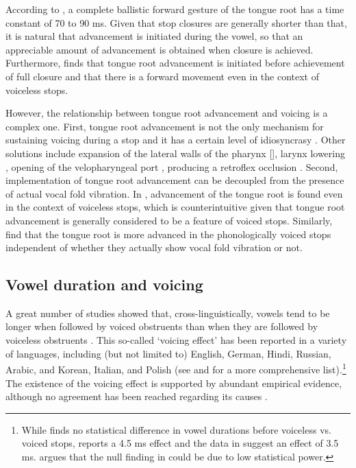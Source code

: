 \documentclass[12pt,]{article}
\let\rmarkdownfootnote\footnote%
\def\footnote{\protect\rmarkdownfootnote}
\begin{document}
According to \citet{rothenberg1967}, a complete ballistic forward
gesture of the tongue root has a time constant of 70 to 90 ms. Given
that stop closures are generally shorter than that, it is natural that
advancement is initiated during the vowel, so that an appreciable amount
of advancement is obtained when closure is achieved. Furthermore,
\citet{westbury1983} finds that tongue root advancement is initiated
before achievement of full closure and that there is a forward movement
even in the context of voiceless stops.

However, the relationship between tongue root advancement and voicing is
a complex one. First, tongue root advancement is not the only mechanism
for sustaining voicing during a stop
\citep{rothenberg1967, westbury1983, ohala2011} and it has a certain
level of idiosyncrasy \citep{ahn2016}. Other solutions include expansion
of the lateral walls of the pharynx {[}{]}, larynx lowering
\citep{riordan1980}, opening of the velopharyngeal port
\citep{yanagihara1966}, producing a retroflex occlusion
\citep{sprouse2008}. Second, implementation of tongue root advancement
can be decoupled from the presence of actual vocal fold vibration. In
\citet{westbury1983}, advancement of the tongue root is found even in
the context of voiceless stops, which is counterintuitive given that
tongue root advancement is generally considered to be a feature of
voiced stops. Similarly, \citet{ahn2015, ahn2016, ahn2018} find that the
tongue root is more advanced in the phonologically voiced stops
independent of whether they actually show vocal fold vibration or not.

\hypertarget{vowel-duration-and-voicing}{%
\subsection{Vowel duration and
voicing}\label{vowel-duration-and-voicing}}

A great number of studies showed that, cross-linguistically, vowels tend
to be longer when followed by voiced obstruents than when they are
followed by voiceless obstruents
\citep{house1953, peterson1960, chen1970, klatt1973, lisker1974, farnetani1986, fowler1992, hussein1994, esposito2002, lampp2004, durvasula2012}.
This so-called `voicing effect' has been reported in a variety of
languages, including (but not limited to) English, German, Hindi,
Russian, Arabic, and Korean, Italian, and Polish (see
\citealt{maddieson1976} and \citealt{begus2017} for a more comprehensive
list).\footnote{While \citet{keating1984} finds no statistical difference in vowel durations before voiceless vs. voiced stops, \citet{nowak2006} reports a 4.5 ms effect and the data in \citet{malisz2008} suggest an effect of 3.5 ms. \citet{begus2017} argues that the null finding in \citet{keating1984} could be due to low statistical power.}
The existence of the voicing effect is supported by abundant empirical
evidence, although no agreement has been reached regarding its causes
\citep{durvasula2012, soskuthy2013}.
\end{document}
